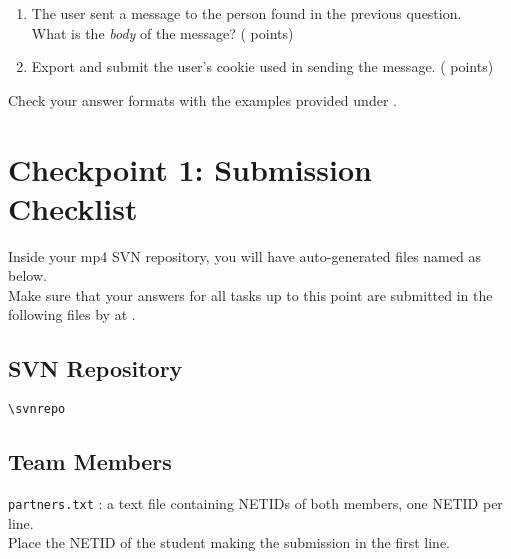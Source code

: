 \begin{enumerate}
  \item \hypertarget{cp1msg}{The user sent a message to the person found in the previous question.\\
  What is the \textit{body} of the message? ( points)} \label{itm:msg}


  \item \hypertarget{cp1cookie}{Export and submit the user's cookie used in sending the message. ( points)} \label{itm:cookie}


\end{enumerate}

Check your answer formats with the examples provided under \textit{}.

\newpage

\section*{Checkpoint 1: Submission Checklist}
\label{sec:cp1checklist}

Inside your mp4 SVN repository, you will have auto-generated files named as below.\\
Make sure that your answers for all tasks up to this point are submitted in the following files by \textbf{\checkpointduedate} at \textbf{\duetime}.

\subsection*{SVN Repository}
\nolinkurl{\svnrepo}

\subsection*{Team Members}
\texttt{partners.txt} : a text file containing NETIDs of both members, one NETID per line.\\
Place the NETID of the student making the submission in the first line.
\vspace{-12pt}
\hypertarget{cp1partners}{}
